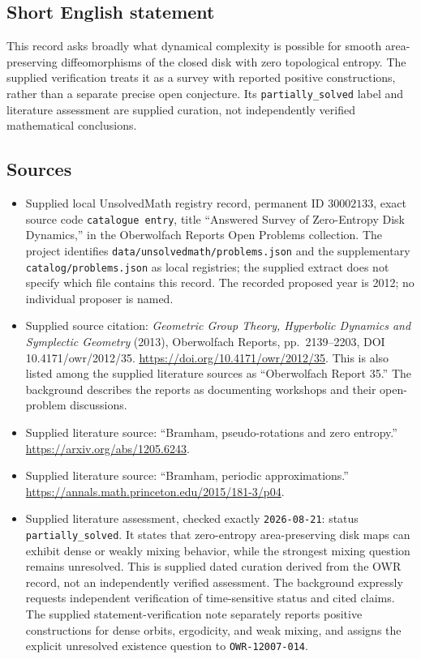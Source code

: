 \documentclass[11pt]{article}
\begin{document}
\subsection{Short English statement}
This record asks broadly what dynamical complexity is possible for smooth area-preserving diffeomorphisms of the closed disk with zero topological entropy. The supplied verification treats it as a survey with reported positive constructions, rather than a separate precise open conjecture. Its \texttt{partially\_solved} label and literature assessment are supplied curation, not independently verified mathematical conclusions.
\subsection{Sources}
\begin{itemize}
\item Supplied local UnsolvedMath registry record, permanent ID \(30002133\), exact source code \texttt{catalogue entry}, title ``Answered Survey of Zero-Entropy Disk Dynamics,'' in the Oberwolfach Reports Open Problems collection. The project identifies \texttt{data/unsolvedmath/problems.json} and the supplementary \texttt{catalog/problems.json} as local registries; the supplied extract does not specify which file contains this record. The recorded proposed year is 2012; no individual proposer is named.
\item Supplied source citation: \emph{Geometric Group Theory, Hyperbolic Dynamics and Symplectic Geometry} (2013), Oberwolfach Reports, pp.~2139--2203, DOI 10.4171/owr/2012/35. \url{https://doi.org/10.4171/owr/2012/35}. This is also listed among the supplied literature sources as ``Oberwolfach Report 35.'' The background describes the reports as documenting workshops and their open-problem discussions.
\item Supplied literature source: ``Bramham, pseudo-rotations and zero entropy.'' \url{https://arxiv.org/abs/1205.6243}.
\item Supplied literature source: ``Bramham, periodic approximations.'' \url{https://annals.math.princeton.edu/2015/181-3/p04}.
\item Supplied literature assessment, checked exactly \texttt{2026-08-21}: status \texttt{partially\_solved}. It states that zero-entropy area-preserving disk maps can exhibit dense or weakly mixing behavior, while the strongest mixing question remains unresolved. This is supplied dated curation derived from the OWR record, not an independently verified assessment. The background expressly requests independent verification of time-sensitive status and cited claims. The supplied statement-verification note separately reports positive constructions for dense orbits, ergodicity, and weak mixing, and assigns the explicit unresolved existence question to \texttt{OWR-12007-014}.
\end{itemize}
\end{document}
